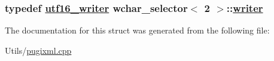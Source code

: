 \hypertarget{structwchar__selector_3_012_01_4_f84979f9b8cd883798fe4e99820d6073}{
\subsubsection[writer]{\setlength{\rightskip}{0pt plus 5cm}typedef \hyperlink{structutf16__writer}{utf16\_\-writer} wchar\_\-selector$<$ 2 $>$::\hyperlink{structutf16__writer}{writer}}}
\label{structwchar__selector_3_012_01_4_f84979f9b8cd883798fe4e99820d6073}




The documentation for this struct was generated from the following file:\begin{CompactItemize}
\item 
Utils/\hyperlink{pugixml_8cpp}{pugixml.cpp}\end{CompactItemize}
